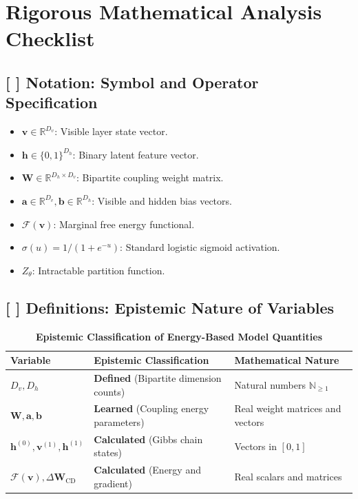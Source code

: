 \documentclass[11pt,a4paper]{article}
\theoremstyle{definition}
\begin{document}
\section{Rigorous Mathematical Analysis Checklist}

\subsection{[ ] Notation: Symbol and Operator Specification}
\begin{itemize}
    \item $\mathbf{v} \in \mathbb{R}^{D_v}$: Visible layer state vector.
    \item $\mathbf{h} \in \{0, 1\}^{D_h}$: Binary latent feature vector.
    \item $\mathbf{W} \in \mathbb{R}^{D_h \times D_v}$: Bipartite coupling weight matrix.
    \item $\mathbf{a} \in \mathbb{R}^{D_v}, \mathbf{b} \in \mathbb{R}^{D_h}$: Visible and hidden bias vectors.
    \item $\mathcal{F}(\mathbf{v})$: Marginal free energy functional.
    \item $\sigma(u) = 1 / (1 + e^{-u})$: Standard logistic sigmoid activation.
    \item $Z_\theta$: Intractable partition function.
\end{itemize}

\subsection{[ ] Definitions: Epistemic Nature of Variables}
\begin{table}[h]
\centering
\caption{\textbf{Epistemic Classification of Energy-Based Model Quantities}}
\begin{tabular}{lll}
\toprule
\textbf{Variable} & \textbf{Epistemic Classification} & \textbf{Mathematical Nature} \\
\midrule
$D_v, D_h$ & \textbf{Defined} (Bipartite dimension counts) & Natural numbers $\mathbb{N}_{\ge 1}$ \\
$\mathbf{W}, \mathbf{a}, \mathbf{b}$ & \textbf{Learned} (Coupling energy parameters) & Real weight matrices and vectors \\
$\mathbf{h}^{(0)}, \mathbf{v}^{(1)}, \mathbf{h}^{(1)}$ & \textbf{Calculated} (Gibbs chain states) & Vectors in $[0, 1]$ \\
$\mathcal{F}(\mathbf{v}), \Delta \mathbf{W}_{\text{CD}}$ & \textbf{Calculated} (Energy and gradient) & Real scalars and matrices \\
\bottomrule
\end{tabular}
\end{table}
\end{document}
